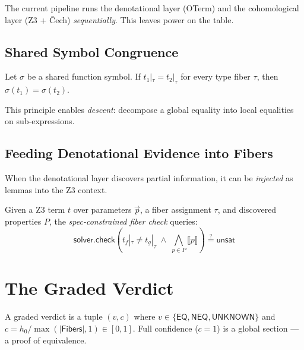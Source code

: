 The current pipeline runs the denotational layer (OTerm) and the
cohomological layer (Z3 + \v{C}ech) \emph{sequentially}.  This
leaves power on the table.

\subsection{Shared Symbol Congruence}

\begin{theorem}
\label{thm:shared-equiv}
Let $\sigma$ be a shared function symbol.  If
$t_1 |_\tau = t_2 |_\tau$ for every type fiber $\tau$, then
$\sigma(t_1) = \sigma(t_2)$.
\end{theorem}

This principle enables \emph{descent}: decompose a global equality
into local equalities on sub-expressions.

\subsection{Feeding Denotational Evidence into Fibers}

When the denotational layer discovers partial information,
it can be \emph{injected} as lemmas into the Z3 context.

\begin{definition}
Given a Z3 term $t$ over parameters $\vec{p}$, a fiber
assignment $\tau$, and discovered properties $P$, the
\emph{spec-constrained fiber check} queries:
\[
  \mathsf{solver.check}\!\left(
    t_f |_\tau \neq t_g |_\tau \;\wedge\;
    \bigwedge_{p \in P} \llbracket p \rrbracket
  \right)
  \stackrel{?}{=} \mathsf{unsat}
\]
\end{definition}


\section{The Graded Verdict}
\label{sec:fallback-graded}

\begin{definition}
\label{def:graded-verdict}
A graded verdict is a tuple $(v, c)$ where
$v \in \{\mathsf{EQ}, \mathsf{NEQ}, \mathsf{UNKNOWN}\}$
and $c = h_0 / \max(|\mathsf{Fibers}|, 1) \in [0,1]$.
Full confidence ($c = 1$) is a global section ---
a proof of equivalence.
\end{definition}

